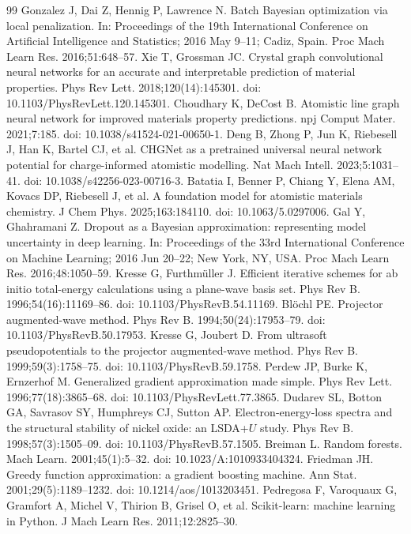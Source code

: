\begin{thebibliography}{99}
 Gonzalez J, Dai Z, Hennig P, Lawrence N. Batch Bayesian optimization via local penalization. In: Proceedings of the 19th International Conference on Artificial Intelligence and Statistics; 2016 May 9--11; Cadiz, Spain. Proc Mach Learn Res. 2016;51:648--57.
 Xie T, Grossman JC. Crystal graph convolutional neural networks for an accurate and interpretable prediction of material properties. Phys Rev Lett. 2018;120(14):145301. doi: 10.1103/PhysRevLett.120.145301.
 Choudhary K, DeCost B. Atomistic line graph neural network for improved materials property predictions. npj Comput Mater. 2021;7:185. doi: 10.1038/s41524-021-00650-1.
 Deng B, Zhong P, Jun K, Riebesell J, Han K, Bartel CJ, et al. CHGNet as a pretrained universal neural network potential for charge-informed atomistic modelling. Nat Mach Intell. 2023;5:1031--41. doi: 10.1038/s42256-023-00716-3.
 Batatia I, Benner P, Chiang Y, Elena AM, Kovacs DP, Riebesell J, et al. A foundation model for atomistic materials chemistry. J Chem Phys. 2025;163:184110. doi: 10.1063/5.0297006.
 Gal Y, Ghahramani Z. Dropout as a Bayesian approximation: representing model uncertainty in deep learning. In: Proceedings of the 33rd International Conference on Machine Learning; 2016 Jun 20--22; New York, NY, USA. Proc Mach Learn Res. 2016;48:1050--59.
 Kresse G, Furthm\"uller J. Efficient iterative schemes for ab initio total-energy calculations using a plane-wave basis set. Phys Rev B. 1996;54(16):11169--86. doi: 10.1103/PhysRevB.54.11169.
 Bl\"ochl PE. Projector augmented-wave method. Phys Rev B. 1994;50(24):17953--79. doi: 10.1103/PhysRevB.50.17953.
 Kresse G, Joubert D. From ultrasoft pseudopotentials to the projector augmented-wave method. Phys Rev B. 1999;59(3):1758--75. doi: 10.1103/PhysRevB.59.1758.
 Perdew JP, Burke K, Ernzerhof M. Generalized gradient approximation made simple. Phys Rev Lett. 1996;77(18):3865--68. doi: 10.1103/PhysRevLett.77.3865.
 Dudarev SL, Botton GA, Savrasov SY, Humphreys CJ, Sutton AP. Electron-energy-loss spectra and the structural stability of nickel oxide: an LSDA+$U$ study. Phys Rev B. 1998;57(3):1505--09. doi: 10.1103/PhysRevB.57.1505.
 Breiman L. Random forests. Mach Learn. 2001;45(1):5--32. doi: 10.1023/A:1010933404324.
 Friedman JH. Greedy function approximation: a gradient boosting machine. Ann Stat. 2001;29(5):1189--1232. doi: 10.1214/aos/1013203451.
 Pedregosa F, Varoquaux G, Gramfort A, Michel V, Thirion B, Grisel O, et al. Scikit-learn: machine learning in Python. J Mach Learn Res. 2011;12:2825--30.
\end{thebibliography}
